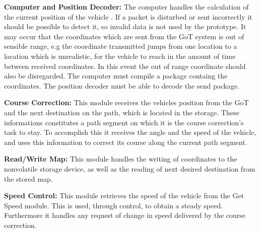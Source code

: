 \textbf{Computer and Position Decoder:}
The computer handles the calculation of the current position of the vehicle . If a packet is disturbed or sent incorrectly it should be possible to detect it, so invalid data is not used by the prototype. It may occur that the coordinates which are sent from the GoT system is out of sensible range, e.g the coordinate transmitted jumps from one location to a location which is unrealistic, for the vehicle to reach in the amount of time between received coordinates. In this event the out of range coordinate should also be disregarded. The computer must compile a package containg the coordinates. The position decoder must be able to decode the send package.

\textbf{Course Correction:}
This module receives the vehicles position from the GoT and the next destination on the path, which is located in the storage. These informations constitutes a path segment on which it is the course correction's task to stay. To accomplish this it receives the angle and the speed of the vehicle, and uses this information to correct its course along the current path segment.

\textbf{Read/Write Map:}
This module handles the writing of coordinates to the nonvolatile storage device, as well as the reading of next desired destination from the stored map.

\textbf{Speed Control:}
This module retrieves the speed of the vehicle from the Get Speed module. This is used, through control, to obtain a steady speed. Furthermore it handles any request of change in speed delivered by the course correction.



